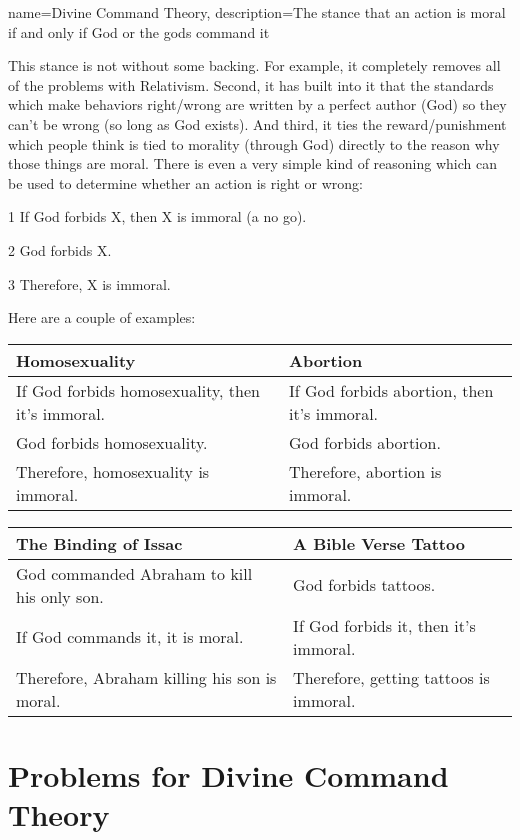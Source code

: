 {
  name=Divine Command Theory,
  description={The stance that an action is moral if and only if God or the gods command it}
}

This stance is not without some backing. For example, it completely removes all of the problems with Relativism. Second, it has built into it that the standards which make behaviors right/wrong are written by a perfect author (God) so they can’t be wrong (so long as God exists). And third, it ties the reward/punishment which people think is tied to morality (through God) directly to the reason why those things are moral. There is even a very simple kind of reasoning which can be used to determine whether an action is right or wrong:

\begin{earg}
    \item[1] If God forbids X, then X is immoral (a no go).
    \item[2] God forbids X.
    \item[3] Therefore, X is immoral.
\end{earg}

Here are a couple of examples:

\begin{tabular}{p{1.5in}|p{1.5in}}
Homosexuality&Abortion\\\hline
If God forbids homosexuality, then it’s immoral.& If God forbids abortion, then it’s immoral.\\
God forbids homosexuality.&    God forbids abortion.\\
Therefore, homosexuality is immoral.&Therefore, abortion is immoral.
\end{tabular}

\begin{tabular}{p{1.5in}|p{1.5in}}
The Binding of Issac&A Bible Verse Tattoo\\\hline
God commanded Abraham to kill his only son.&God forbids tattoos.\\
If God commands it, it is moral.&If God forbids it, then it’s immoral.\\
Therefore, Abraham killing his son is moral.&Therefore, getting tattoos is immoral.
\end{tabular}

\section{Problems for Divine Command Theory}


